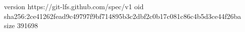version https://git-lfs.github.com/spec/v1
oid sha256:2ce41262fead9c49797f9bf714895b3c2dbf2c0b17c081c86c4b5d3ce44f26ba
size 391698
